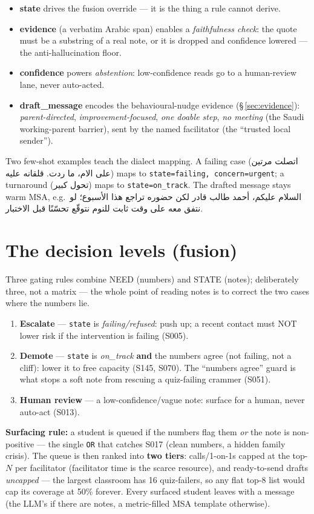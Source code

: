 \documentclass[11pt,paper=a4,parskip=half,DIV=11]{scrartcl}
\newcommand{\ar}[1]{\foreignlanguage{arabic}{#1}}
\begin{document}
\begin{why}
\begin{itemize}
\item \textbf{state} drives the fusion override --- it is the thing a rule cannot derive.
\item \textbf{evidence} (a verbatim Arabic span) enables a \emph{faithfulness check}: the quote must be a
substring of a real note, or it is dropped and confidence lowered --- the anti-hallucination floor.
\item \textbf{confidence} powers \emph{abstention}: low-confidence reads go to a human-review lane, never
auto-acted.
\item \textbf{draft\_message} encodes the behavioural-nudge evidence (\S\,\ref{sec:evidence}):
\emph{parent-directed}, \emph{improvement-focused}, \emph{one doable step}, \emph{no meeting} (the Saudi
working-parent barrier), sent by the named facilitator (the ``trusted local sender'').
\end{itemize}
\end{why}

Two few-shot examples teach the dialect mapping. A failing case
(\ar{اتصلت مرتين على الام، ما ردت. قلقانه عليه}) maps to \texttt{state=failing, concern=urgent}; a
turnaround (\ar{تحول كبير}) maps to \texttt{state=on\_track}. The drafted message stays warm MSA, e.g.\
\ar{السلام عليكم، أحمد طالب قادر لكن حضوره تراجع هذا الأسبوع؛ لو نتفق معه على وقت ثابت للنوم نتوقّع
تحسّنًا قبل الاختبار.}

\section{The decision levels (fusion)}
Three gating rules combine NEED (numbers) and STATE (notes); deliberately three, not a matrix --- the
whole point of reading notes is to correct the two cases where the numbers lie.
\begin{enumerate}
\item \textbf{Escalate} --- \texttt{state} is \emph{failing/refused}: push up; a recent contact must NOT
lower risk if the intervention is failing (S005).
\item \textbf{Demote} --- \texttt{state} is \emph{on\_track} \textbf{and} the numbers agree (not failing,
not a cliff): lower it to free capacity (S145, S070). The ``numbers agree'' guard is what stops a soft
note from rescuing a quiz-failing crammer (S051).
\item \textbf{Human review} --- a low-confidence/vague note: surface for a human, never auto-act (S013).
\end{enumerate}
\textbf{Surfacing rule:} a student is queued if the numbers flag them \emph{or} the note is non-positive
--- the single \texttt{OR} that catches S017 (clean numbers, a hidden family crisis). The queue is then
ranked into \textbf{two tiers}: calls/1-on-1s capped at the top-$N$ per facilitator (facilitator time is
the scarce resource), and ready-to-send drafts \emph{uncapped} --- the largest classroom has 16
quiz-failers, so any flat top-8 list would cap its coverage at 50\% forever. Every surfaced student
leaves with a message (the LLM's if there are notes, a metric-filled MSA template otherwise).
\end{document}
